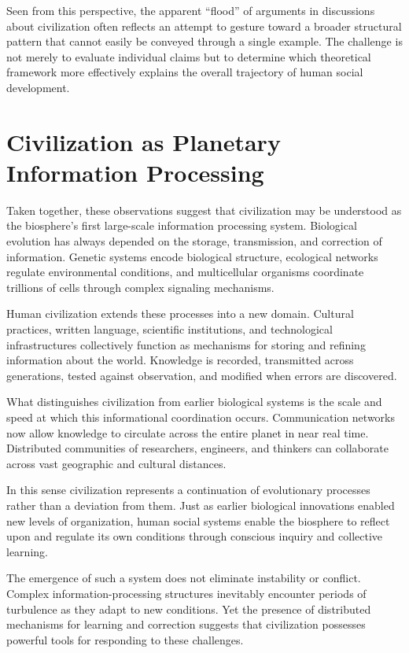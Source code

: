 \documentclass[12pt]{article}
\begin{document}
Seen from this perspective, the apparent ``flood'' of arguments in discussions about civilization often reflects an attempt to gesture toward a broader structural pattern that cannot easily be conveyed through a single example. The challenge is not merely to evaluate individual claims but to determine which theoretical framework more effectively explains the overall trajectory of human social development.

\section{Civilization as Planetary Information Processing}

Taken together, these observations suggest that civilization may be understood as the biosphere's first large-scale information processing system. Biological evolution has always depended on the storage, transmission, and correction of information. Genetic systems encode biological structure, ecological networks regulate environmental conditions, and multicellular organisms coordinate trillions of cells through complex signaling mechanisms.

Human civilization extends these processes into a new domain. Cultural practices, written language, scientific institutions, and technological infrastructures collectively function as mechanisms for storing and refining information about the world. Knowledge is recorded, transmitted across generations, tested against observation, and modified when errors are discovered.

What distinguishes civilization from earlier biological systems is the scale and speed at which this informational coordination occurs. Communication networks now allow knowledge to circulate across the entire planet in near real time. Distributed communities of researchers, engineers, and thinkers can collaborate across vast geographic and cultural distances.

In this sense civilization represents a continuation of evolutionary processes rather than a deviation from them. Just as earlier biological innovations enabled new levels of organization, human social systems enable the biosphere to reflect upon and regulate its own conditions through conscious inquiry and collective learning.

The emergence of such a system does not eliminate instability or conflict. Complex information-processing structures inevitably encounter periods of turbulence as they adapt to new conditions. Yet the presence of distributed mechanisms for learning and correction suggests that civilization possesses powerful tools for responding to these challenges.
\end{document}
